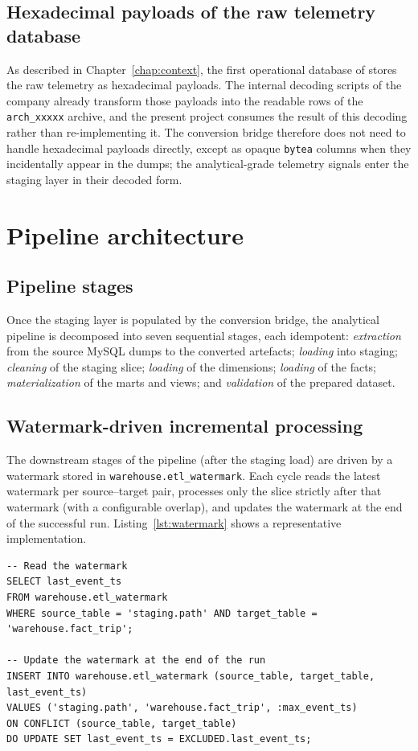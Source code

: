 \subsection{Hexadecimal payloads of the raw telemetry database}
As described in Chapter~\ref{chap:context}, the first operational database of \hostorg{} stores the raw telemetry as hexadecimal payloads. The internal decoding scripts of the company already transform those payloads into the readable rows of the \texttt{arch\_xxxxx} archive, and the present project consumes the result of this decoding rather than re-implementing it. The conversion bridge therefore does not need to handle hexadecimal payloads directly, except as opaque \texttt{bytea} columns when they incidentally appear in the dumps; the analytical-grade telemetry signals enter the staging layer in their decoded form.

\section{Pipeline architecture}

\subsection{Pipeline stages}
Once the staging layer is populated by the conversion bridge, the analytical pipeline is decomposed into seven sequential stages, each idempotent: \emph{extraction} from the source MySQL dumps to the converted artefacts; \emph{loading} into staging; \emph{cleaning} of the staging slice; \emph{loading} of the dimensions; \emph{loading} of the facts; \emph{materialization} of the marts and views; and \emph{validation} of the prepared dataset.

\subsection{Watermark-driven incremental processing}
The downstream stages of the pipeline (after the staging load) are driven by a watermark stored in \texttt{warehouse.etl\_watermark}. Each cycle reads the latest watermark per source--target pair, processes only the slice strictly after that watermark (with a configurable overlap), and updates the watermark at the end of the successful run. Listing~\ref{lst:watermark} shows a representative implementation.

\begin{lstlisting}[style=sql,caption={Reading and updating a watermark.},label={lst:watermark}]
-- Read the watermark
SELECT last_event_ts
FROM warehouse.etl_watermark
WHERE source_table = 'staging.path' AND target_table = 'warehouse.fact_trip';

-- Update the watermark at the end of the run
INSERT INTO warehouse.etl_watermark (source_table, target_table, last_event_ts)
VALUES ('staging.path', 'warehouse.fact_trip', :max_event_ts)
ON CONFLICT (source_table, target_table)
DO UPDATE SET last_event_ts = EXCLUDED.last_event_ts;
\end{lstlisting}


